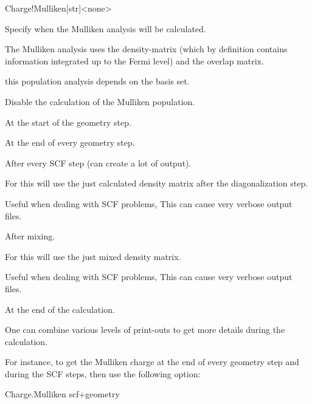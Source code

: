 \begin{fdfentry}{Charge!Mulliken}[str]<none>

  Specify when the Mulliken analysis will be calculated.

  The Mulliken analysis uses the density-matrix (which by definition contains
  information integrated up to the Fermi level) and the overlap matrix.
  
  \note this population analysis depends on the basis set.

  \begin{fdfoptions}
    \option[none]%
    Disable the calculation of the Mulliken population.
    
    \option[init]%
    At the start of the geometry step.

    \option[geometry]%
    At the end of every geometry step.

    \option[scf]%
    After every SCF step (can create a lot of output).

    For  this will use the just calculated density matrix
    after the diagonalization step.

    Useful when dealing with SCF problems,
    This can cause very verbose output files.
    
    After mixing.
    
    For  this will use the just mixed density matrix.

    Useful when dealing with SCF problems,
    This can cause very verbose output files.
    
    \option[end]%
    At the end of the calculation.

  \end{fdfoptions}

  One can combine various levels of print-outs to get more details during the calculation.

  For instance, to get the Mulliken charge at the end of every geometry step and
  during the SCF steps, then use the following option:
  \begin{fdfexample}
    Charge.Mulliken scf+geometry
  \end{fdfexample}


\end{fdfentry}

